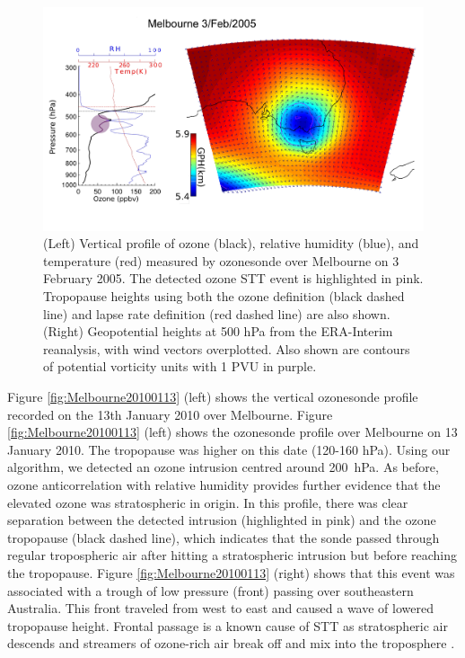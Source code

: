 \documentclass{article}
\begin{document}
    \begin{figure}[!htbp]
      \begin{center}
      \includegraphics[width=1.0\columnwidth]{figures/Melbourne20050203.png}
      \caption{(Left) Vertical profile of ozone (black), relative humidity (blue), and temperature (red) measured by ozonesonde over Melbourne on 3 February 2005.
      The detected ozone STT event is highlighted in pink.
      Tropopause heights using both the ozone definition (black dashed line) and lapse rate definition (red dashed line) are also shown.
      (Right) Geopotential heights at 500 hPa from the ERA-Interim reanalysis, with wind vectors overplotted.
      Also shown are contours of potential vorticity units with 1 PVU in purple.}
      \label{fig:Melbourne20050203}
      \end{center}
    \end{figure}
    
    Figure \ref{fig:Melbourne20100113} (left) shows the vertical ozonesonde profile recorded on the 13th January 2010 over Melbourne.
    Figure \ref{fig:Melbourne20100113} (left) shows the ozonesonde profile over Melbourne on 13 January 2010.
    The tropopause was higher on this date (120-160 hPa).
    Using our algorithm, we detected an ozone intrusion centred around 200~hPa.
    As before, ozone anticorrelation with relative humidity provides further evidence that the elevated ozone was stratospheric in origin.
    In this profile, there was clear separation between the detected intrusion (highlighted in pink) and the ozone tropopause (black dashed line), which indicates that the sonde passed through regular tropospheric air after hitting a stratospheric intrusion but before reaching the tropopause.
    Figure \ref{fig:Melbourne20100113} (right) shows that this event was associated with a trough of low pressure (front) passing over southeastern Australia.
    This front traveled from west to east and caused a wave of lowered tropopause height. 
    Frontal passage is a known cause of STT as stratospheric air descends and streamers of ozone-rich air break off and mix into the troposphere \citep{Sprenger2003}.
    
\end{document}
